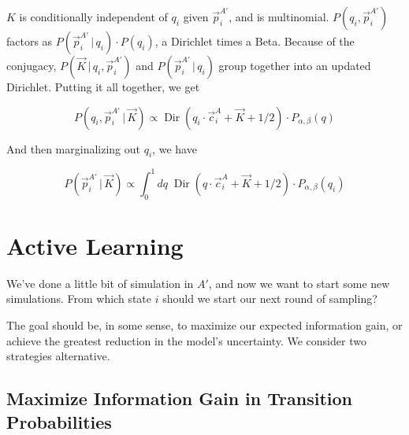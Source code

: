 \documentclass[twocolumn,floatfix,nofootinbib,aps]{revtex4-1}
\renewcommand{\vert}{\, | \,}
\begin{document}
$K$ is conditionally independent of $q_i$ given $\vec{p}_i^{A'}$, and is multinomial. $P(q_i, \vec{p}_i^{A'})$ factors as $P(\vec{p}_i^{A'} \vert q_i) \cdot  P(q_i)$, a Dirichlet times a Beta. Because of the conjugacy, $P(\vec{K} \vert q_i, \vec{p}_i^{A'})$ and $P(\vec{p}_i^{A'} \vert q_i)$ group together into an updated Dirichlet. Putting it all together, we get

$$
P(q_i, \vec{p}_i^{A'} \vert \vec{K}) \propto \operatorname{Dir}(q_i \cdot \vec{c}_i^{A} + \vec{K} + 1/2) \cdot P_{\alpha, \beta}(q)
$$

And then marginalizing out $q_i$, we have


$$
P(\vec{p}_i^{A'} \vert \vec{K}) \propto \int_0^1 dq \; \operatorname{Dir}(q \cdot \vec{c}_i^{A} + \vec{K} + 1/2) \cdot  P_{\alpha, \beta}(q_i)
$$






\section{Active Learning}
We've done a little bit of simulation in $A'$, and now we want to start some new simulations. From which state $i$ should we start our next round of sampling?

The goal should be, in some sense, to maximize our expected information gain, or achieve the greatest reduction in the model's uncertainty. We consider two strategies alternative.

\subsection{Maximize Information Gain in Transition Probabilities}
\end{document}
